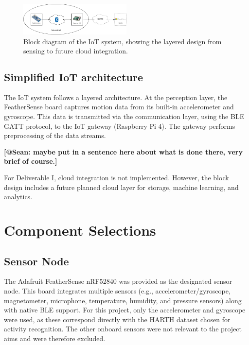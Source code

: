 \documentclass[conference]{IEEEtran}
\begin{document}
\begin{figure}[h]
	\centering
	\includegraphics[width=0.5\textwidth]{media/basic_diagram.png}
	\caption{Block diagram of the IoT system, showing the layered design from sensing to future cloud integration.}
	\label{fig:block_diagram}
\end{figure}


\subsection{Simplified IoT architecture}

The IoT system follows a layered architecture. At the perception layer, the FeatherSense board captures motion data from its built-in accelerometer and gyroscope. This data is transmitted via the communication layer, using the BLE GATT protocol, to the IoT gateway (Raspberry Pi 4). The gateway performs preprocessing of the data streams. 

\textbf{[@Sean: maybe put in a sentence here about what is done there, very brief of course.]} 

For Deliverable I, cloud integration is not implemented. However, the block design includes a future planned cloud layer for storage, machine learning, and analytics.



\section{Component Selections}\label{CS}

\subsection{Sensor Node}\label{SN}
The Adafruit FeatherSense nRF52840\cite{b7} was provided as the designated sensor node. This board integrates multiple sensors (e.g., accelerometer/gyroscope, magnetometer, microphone, temperature, humidity, and pressure sensors) along with native BLE support. For this project, only the accelerometer and gyroscope were used, as these correspond directly with the HARTH dataset \cite{b5,b6} chosen for activity recognition. The other onboard sensors were not relevant to the project aims and were therefore excluded.
\end{document}
